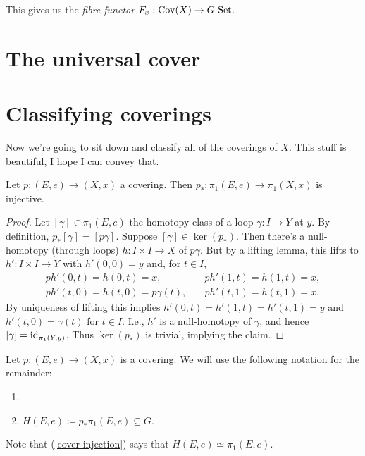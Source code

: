 \medskip
This gives us the \emph{fibre functor} $F_x : \operatorname{Cov}(X) \to
G\text{-}\mathrm{Set}$.


\section{The universal cover}


\section{Classifying coverings}

Now we're going to sit down and classify all of the coverings of
$X$. This stuff is beautiful, I hope I can convey that.

\begin{lemma}
  \label{cover-injection}
  Let $p : (E,e) \to (X,x)$ a covering. Then $p_* : \pi_1(E,e) \to
  \pi_1(X,x)$ is injective.
\end{lemma}

\begin{proof}
  Let $[\gamma] \in \pi_1(E,e)$ the homotopy class of a loop $\gamma :
  I \to Y$ at $y$. By definition, $p_*[\gamma] = [p\gamma]$. Suppose
  $[\gamma] \in \ker(p_*)$. Then there's a null-homotopy (through
  loops) $h : I \times I \to X$ of $p\gamma$. But by a lifting lemma,
  this lifts to $h' : I \times I \to Y$ with $h'(0,0) = y$ and, for $t
  \in I$,
  \begin{align*}
    ph'(0,t) = h(0,t) = x, \quad &ph'(1,t) = h(1,t) = x, \\ ph'(t,0) =
    h(t,0) = p\gamma(t), \quad &ph'(t,1) = h(t,1) = x.
  \end{align*}
  By uniqueness of lifting this implies $h'(0,t) = h'(1,t) = h'(t,1) =
  y$ and $h'(t,0) = \gamma(t)$ for $t \in I$. I.e., $h'$ is a
  null-homotopy of $\gamma$, and hence $[\gamma] =
  \mathrm{id}_{\pi_1(Y,y)}$. Thus $\ker(p_*)$ is trivial, implying the claim.
\end{proof}

\begin{notation}
  Let $p : (E,e) \to (X,x)$ is a covering. We will use the following
  notation for the remainder:
  \begin{enumerate}
  \item
  \item $H(E,e) \coloneqq p_*\pi_1(E,e) \subseteq G$.
  \end{enumerate}
  Note that (\ref{cover-injection}) says that $H(E,e) \simeq
  \pi_1(E,e)$.
\end{notation}

